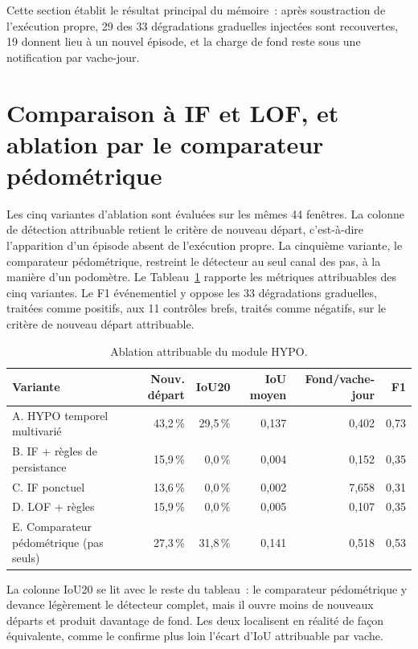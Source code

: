 Cette section établit le résultat principal du mémoire~: après soustraction de l'exécution
propre, 29 des 33 dégradations graduelles injectées sont recouvertes, 19 donnent lieu à un
nouvel épisode, et la charge de fond reste sous une notification par vache-jour.

\section{Comparaison à IF et LOF, et ablation par le comparateur pédométrique}
Les cinq variantes d'ablation sont évaluées sur les mêmes 44 fenêtres. La colonne de détection
attribuable retient le critère de nouveau départ, c'est-à-dire l'apparition d'un épisode
absent de l'exécution propre. La cinquième variante, le comparateur pédométrique, restreint
le détecteur au seul canal des pas, à la manière d'un podomètre. Le
Tableau~\ref{tab:hypo_ablation} rapporte les métriques attribuables des cinq variantes. Le
F1 événementiel y oppose les 33 dégradations graduelles, traitées comme positifs, aux
11 contrôles brefs, traités comme négatifs, sur le critère de nouveau départ attribuable.

\begin{table}[H]
  \centering
  \caption{Ablation attribuable du module HYPO.}
  \label{tab:hypo_ablation}
  \small
  \begin{tabular}{lrrrrr}
    \toprule
    Variante & Nouv. départ & IoU20 & IoU moyen & Fond/vache-jour & F1 \\
    \midrule
    A. HYPO temporel multivarié & 43,2\,\% & 29,5\,\% & 0,137 & 0,402 & 0,73 \\
    B. IF + règles de persistance & 15,9\,\% & 0,0\,\% & 0,004 & 0,152 & 0,35 \\
    C. IF ponctuel & 13,6\,\% & 0,0\,\% & 0,002 & 7,658 & 0,31 \\
    D. LOF + règles & 15,9\,\% & 0,0\,\% & 0,005 & 0,107 & 0,35 \\
    E. Comparateur pédométrique (pas seuls) & 27,3\,\% & 31,8\,\% & 0,141 & 0,518 & 0,53 \\
    \bottomrule
  \end{tabular}
\end{table}

La colonne IoU20 se lit avec le reste du tableau~: le comparateur pédométrique y devance
légèrement le détecteur complet, mais il ouvre moins de nouveaux départs et produit davantage
de fond. Les deux localisent en réalité de
façon équivalente, comme le confirme plus loin l'écart d'IoU attribuable par vache.

